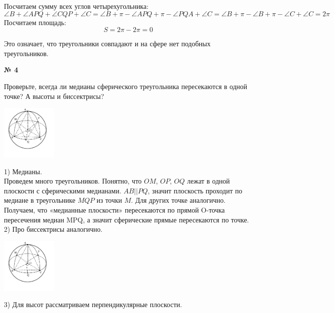     Посчитаем сумму всех углов четырехугольника:
    \[
        \angle B + \angle APQ + \angle CQP + \angle C =
        \angle B + \pi - \angle APQ + \pi - \angle PQA + \angle C =
        \angle B + \pi - \angle B + \pi - \angle C + \angle C = 2\pi
    \]
    Посчитаем площадь:
    \[
        S = 2\pi - 2\pi = 0
    \]

    Это означает, что треугольники совпадают и на сфере нет подобных треугольников.

    \begin{center}
        \textbf{№ 4}
    \end{center}
    Проверьте, всегда ли медианы сферического треугольника пересекаются в одной точке?
    А высоты и биссектрисы?

    \begin{center}
        \includegraphics[width=0.2\textwidth]{images/Frame 73}\\
    \end{center}

    1) Медианы.\\

    Проведем много треугольников.
    Понятно, что $OM$, $OP$, $OQ$ лежат в одной плоскости с сферическими медианами.
    $AB || PQ$, значит плоскость проходит по медиане в треугольнике $MQP$ из точки $M$.
    Для других точке аналогично.
    Получаем, что «медианные плоскости» пересекаются по прямой O-точка пересечения медиан MPQ,
    а значит сферические прямые пересекаются по точке.\\

    2) Про биссектрисы аналогично.

     \begin{center}
        \includegraphics[width=0.2\textwidth]{images/Frame 74}\\
    \end{center}

    3) Для высот рассматриваем перпендикулярные плоскости.

